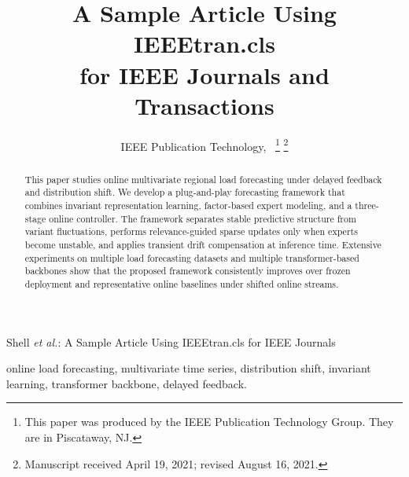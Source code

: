 ﻿\documentclass[journal]{IEEEtran}
\newenvironment{auditproblemblock}{\begingroup\color{red}}{\endgroup}
\begin{document}
\begin{auditproblemblock}
\title{A Sample Article Using IEEEtran.cls\\ for IEEE Journals and Transactions}

\author{IEEE Publication Technology,~
\thanks{This paper was produced by the IEEE Publication Technology Group. They are in Piscataway, NJ.}%
\thanks{Manuscript received April 19, 2021; revised August 16, 2021.}}

%
{Shell \MakeLowercase{\textit{et al.}}: A Sample Article Using IEEEtran.cls for IEEE Journals}

\end{auditproblemblock}

\maketitle

\begin{abstract}
\begin{auditproblemblock}
This paper studies online multivariate regional load forecasting under delayed feedback and distribution shift. We develop a plug-and-play forecasting framework that combines invariant representation learning, factor-based expert modeling, and a three-stage online controller. The framework separates stable predictive structure from variant fluctuations, performs relevance-guided sparse updates only when experts become unstable, and applies transient drift compensation at inference time. Extensive experiments on multiple load forecasting datasets and multiple transformer-based backbones show that the proposed framework consistently improves over frozen deployment and representative online baselines under shifted online streams.
\end{auditproblemblock}
\end{abstract}

\begin{IEEEkeywords}
online load forecasting, multivariate time series, distribution shift, invariant learning, transformer backbone, delayed feedback.
\end{IEEEkeywords}
\end{document}
